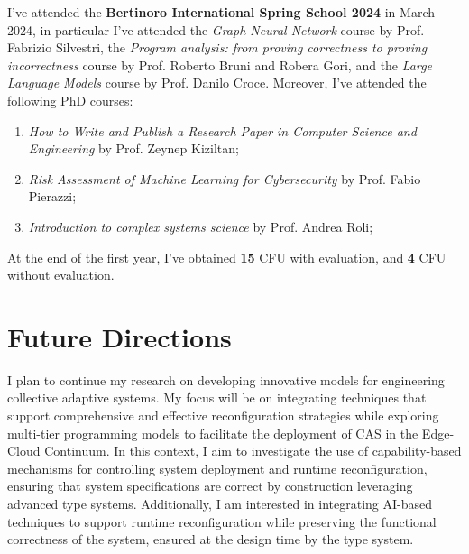 \documentclass[runningheads]{llncs}
\begin{document}
I've attended the \textbf{Bertinoro International Spring School 2024} in March 2024,
in particular I've attended the \emph{Graph Neural Network} course by Prof. Fabrizio Silvestri,
the \emph{Program analysis: from proving correctness to proving incorrectness} course by Prof. Roberto Bruni and Robera Gori,
and the \emph{Large Language Models} course by Prof. Danilo Croce.
%
Moreover,
I've attended the following PhD courses:
\begin{enumerate}
    \item \emph{How to Write and Publish a Research Paper in Computer Science and Engineering} by Prof. Zeynep Kiziltan;
    \item \emph{Risk Assessment of Machine Learning for Cybersecurity} by Prof. Fabio Pierazzi;
    \item \emph{Introduction to complex systems science} by Prof. Andrea Roli;
\end{enumerate}
At the end of the first year,
I've obtained \textbf{15} CFU with evaluation, and \textbf{4} CFU without evaluation.



\section{Future Directions}
\label{sec:future-directions}

I plan to continue my research on developing innovative models for engineering collective adaptive systems.
%
My focus will be on integrating techniques that support comprehensive
and effective reconfiguration strategies while exploring multi-tier programming models to facilitate the deployment of CAS in the Edge-Cloud Continuum.
%
In this context,
I aim to investigate the use of capability-based mechanisms for controlling system deployment and runtime reconfiguration,
ensuring that system specifications are correct by construction leveraging advanced type systems.
%
Additionally,
I am interested in integrating AI-based techniques to support runtime reconfiguration while preserving the functional correctness of the system,
ensured at the design time by the type system.


%
%
%
% 
% 
\printbibliography
\end{document}
